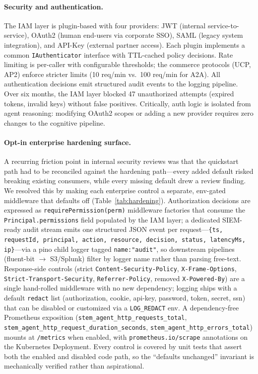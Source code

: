 \documentclass[11pt]{article}
\begin{document}
\paragraph{Security and authentication.} The IAM layer is plugin-based with four providers: JWT (internal service-to-service), OAuth2 (human end-users via corporate SSO), SAML (legacy system integration), and API-Key (external partner access). Each plugin implements a common \texttt{IAuthenticator} interface with TTL-cached policy decisions. Rate limiting is per-caller with configurable thresholds; the commerce protocols (UCP, AP2) enforce stricter limits (10 req/min vs.\ 100 req/min for A2A). All authentication decisions emit structured audit events to the logging pipeline. Over six months, the IAM layer blocked 47 unauthorized attempts (expired tokens, invalid keys) without false positives. Critically, auth logic is isolated from agent reasoning: modifying OAuth2 scopes or adding a new provider requires zero changes to the cognitive pipeline.

\paragraph{Opt-in enterprise hardening surface.} A recurring friction point in internal security reviews was that the quickstart path had to be reconciled against the hardening path---every added default risked breaking existing consumers, while every missing default drew a review finding. We resolved this by making each enterprise control a separate, env-gated middleware that defaults off (Table~\ref{tab:hardening}). Authorization decisions are expressed as \texttt{requirePermission(perm)} middleware factories that consume the \texttt{Principal.permissions} field populated by the IAM layer; a dedicated SIEM-ready audit stream emits one structured JSON event per request---\texttt{\{ts, requestId, principal, action, resource, decision, status, latencyMs, ip\}}---via a pino child logger tagged \texttt{name:"audit"}, so downstream pipelines (fluent-bit $\to$ S3/Splunk) filter by logger name rather than parsing free-text. Response-side controls (strict \texttt{Content-Security-Policy}, \texttt{X-Frame-Options}, \texttt{Strict-Transport-Security}, \texttt{Referrer-Policy}, removed \texttt{X-Powered-By}) are a single hand-rolled middleware with no new dependency; logging ships with a default \texttt{redact} list (authorization, cookie, api-key, password, token, secret, ssn) that can be disabled or customized via a \texttt{LOG\_REDACT} env. A dependency-free Prometheus exposition (\texttt{stem\_agent\_http\_requests\_total}, \texttt{stem\_agent\_http\_request\_duration\_seconds}, \texttt{stem\_agent\_http\_errors\_total}) mounts at \texttt{/metrics} when enabled, with \texttt{prometheus.io/scrape} annotations on the Kubernetes Deployment. Every control is covered by unit tests that assert both the enabled and disabled code path, so the ``defaults unchanged'' invariant is mechanically verified rather than aspirational.
\end{document}
